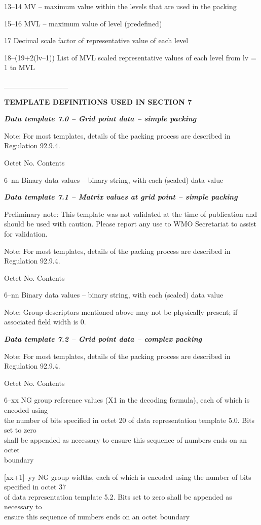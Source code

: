 13--14 MV -- maximum value within the levels that are used in the packing

15--16 MVL -- maximum value of level (predefined)

17 Decimal scale factor of representative value of each level

18--(19+2(lv--1)) List of MVL scaled representative values of each level from lv = 1 to MVL

\_\_\_\_\_\_\_\_\_\_\_\_

\textbf{TEMPLATE DEFINITIONS USED IN SECTION 7}

\emph{\textbf{Data template 7.0 -- Grid point data -- simple packing}}

Note: For most templates, details of the packing process are described in Regulation 92.9.4.

Octet No. Contents

6--nn Binary data values -- binary string, with each (scaled) data value

\emph{\textbf{Data template 7.1 -- Matrix values at grid point -- simple packing}}

Preliminary note: This template was not validated at the time of publication and should be used with caution. Please report any use to WMO Secretariat to assist for validation.

Note: For most templates, details of the packing process are described in Regulation 92.9.4.

Octet No. Contents

6--nn Binary data values -- binary string, with each (scaled) data value

Note: Group descriptors mentioned above may not be physically present; if associated field width is 0.

\emph{\textbf{Data template 7.2 -- Grid point data -- complex packing}}

Note: For most templates, details of the packing process are described in Regulation 92.9.4.

Octet No. Contents

6--xx NG group reference values (X1 in the decoding formula), each of which is encoded using\\
the number of bits specified in octet 20 of data representation template 5.0. Bits set to zero\\
shall be appended as necessary to ensure this sequence of numbers ends on an octet\\
boundary

{[}xx+1{]}--yy NG group widths, each of which is encoded using the number of bits specified in octet 37\\
of data representation template 5.2. Bits set to zero shall be appended as necessary to\\
ensure this sequence of numbers ends on an octet boundary

